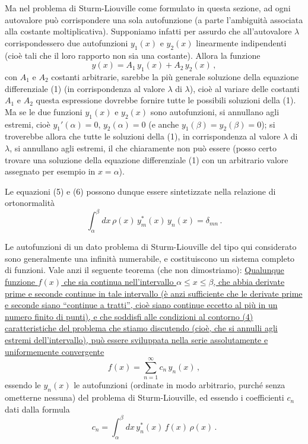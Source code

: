 \documentclass[11pt, a4paper]{book}
\numberwithin{equation}{section}
\begin{document}
Ma nel problema di Sturm-Liouville come formulato in questa sezione, ad ogni autovalore può corrispondere una sola autofunzione (a parte l'ambiguità associata alla costante moltiplicativa). Supponiamo infatti per assurdo che all'autovalore $\lambda$ corrispondessero due autofunzioni $y_1(x)$ e $y_2(x)$ linearmente indipendenti (cioè tali che il loro rapporto non sia una costante). Allora la funzione
\[
y(x)=A_1\,y_1(x)+A_2\,y_2(x)\,,
\]
con $A_1$ e $A_2$ costanti arbitrarie, sarebbe la più generale soluzione della equazione differenziale (1) (in corrispondenza al valore $\lambda$ di $\lambda$), cioè al variare delle costanti $A_1$ e $A_2$ questa espressione dovrebbe fornire tutte le possibili soluzioni della (1). Ma se le due funzioni $y_1(x)$ e $y_2(x)$ sono autofunzioni, si annullano agli estremi, cioè $y_1'(\alpha)=0$, $y_2(\alpha)=0$ (e anche $y_1(\beta)=y_2(\beta)=0$); si troverebbe allora che tutte le soluzioni della (1), in corrispondenza al valore $\lambda$ di $\lambda$, si annullano agli estremi, il che chiaramente non può essere (posso certo trovare una soluzione della equazione differenziale (1) con un arbitrario valore assegnato per esempio in $x=\alpha$).

Le equazioni (5) e (6) possono dunque essere sintetizzate nella relazione di ortonormalità
\begin{equation}
\int_\alpha^\beta dx\,\rho(x)\,y_m^*(x)\,y_n(x)=\delta_{mn}\,. \tag{7}
\end{equation}

Le autofunzioni di un dato problema di Sturm-Liouville del tipo qui considerato sono generalmente una infinità numerabile, e costituiscono un sistema completo di funzioni. Vale anzi il seguente teorema (che non dimostriamo): \uline{Qualunque funzione $f(x)$ che sia continua nell'intervallo $\alpha\leq x\leq\beta$, che abbia derivate prime e seconde continue in tale intervallo (è anzi sufficiente che le derivate prime e seconde siano ``continue a tratti'', cioè siano continue eccetto al più in un numero finito di punti), e che soddisfi alle condizioni al contorno (4) caratteristiche del problema che stiamo discutendo (cioè, che si annulli agli estremi dell'intervallo), può essere sviluppata nella serie assolutamente e uniformemente convergente}
\begin{equation}
f(x)=\sum_{n=1}^{\infty}c_n\,y_n(x)\,, \tag{8}
\end{equation}
essendo le $y_n(x)$ le autofunzioni (ordinate in modo arbitrario, purché senza ometterne nessuna) del problema di Sturm-Liouville, ed essendo i coefficienti $c_n$ dati dalla formula
\begin{equation}
c_n=\int_\alpha^\beta dx\,y_n^*(x)\,f(x)\,\rho(x)\,. \tag{9}
\end{equation}
\end{document}
